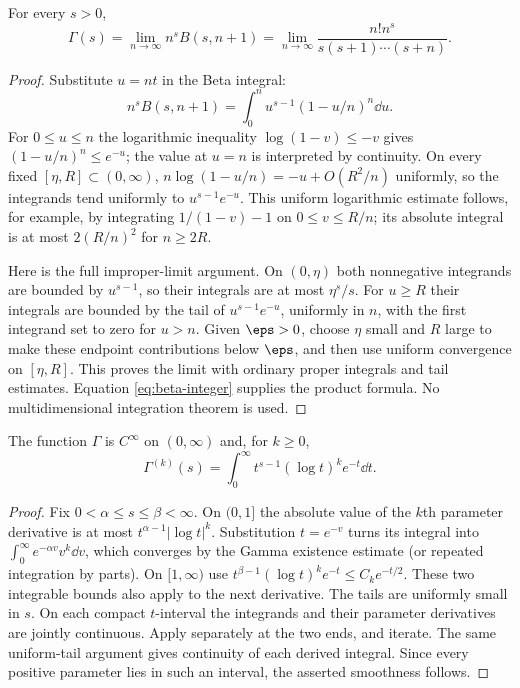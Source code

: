 \begin{theorem}
For every $s>0$,
\begin{equation}\label{eq:gamma-euler}
 \Gamma(s)=\lim_{n\to\infty}n^sB(s,n+1)
 =\lim_{n\to\infty}\frac{n!n^s}{s(s+1)\cdots(s+n)}.
\end{equation}
\end{theorem}
\begin{proof}
Substitute $u=nt$ in the Beta integral:
\[
 n^sB(s,n+1)=\int_0^n u^{s-1}(1-u/n)^n\dd u.
\]
For $0\leq u\leq n$ the logarithmic inequality $\log(1-v)\leq-v$ gives
$(1-u/n)^n\leq e^{-u}$; the value at $u=n$ is interpreted by continuity.
On every fixed $[\eta,R]\subset(0,\infty)$,
$n\log(1-u/n)=-u+O(R^2/n)$ uniformly, so the integrands tend uniformly to
$u^{s-1}e^{-u}$. This uniform logarithmic estimate follows, for example, by
integrating $1/(1-v)-1$ on $0\leq v\leq R/n$; its absolute integral is at most
$2(R/n)^2$ for $n\geq2R$.

Here is the full improper-limit argument. On $(0,\eta)$ both nonnegative
integrands are bounded by $u^{s-1}$, so their integrals are at most $\eta^s/s$.
For $u\geq R$ their integrals are bounded by the tail of
$u^{s-1}e^{-u}$, uniformly in $n$, with the first integrand set to zero for
$u>n$. Given $\eps>0$, choose $\eta$ small and $R$ large to make these endpoint
contributions below $\eps$, and then use uniform convergence on $[\eta,R]$.
This proves the limit with ordinary proper integrals and tail estimates.
Equation \eqref{eq:beta-integer} supplies the product formula. No
multidimensional integration theorem is used.
\end{proof}

\begin{theorem}
The function $\Gamma$ is $C^\infty$ on $(0,\infty)$ and, for $k\geq0$,
\[
 \Gamma^{(k)}(s)=\int_0^\infty t^{s-1}(\log t)^k e^{-t}\dd t.
\]
\end{theorem}
\begin{proof}
Fix $0<\alpha\leq s\leq\beta<\infty$. On $(0,1]$ the absolute value of the
$k$th parameter derivative is at most
$t^{\alpha-1}|\log t|^k$. Substitution $t=e^{-v}$ turns its integral into
$\int_0^\infty e^{-\alpha v}v^k\dd v$, which converges by the Gamma
existence estimate (or repeated integration by parts). On $[1,\infty)$ use
$t^{\beta-1}(\log t)^ke^{-t}\leq C_k e^{-t/2}$. These two integrable bounds
also apply to the next derivative. The tails are uniformly small in $s$.
On each compact $t$-interval the integrands and their parameter derivatives are
jointly continuous. Apply  separately at the
two ends, and iterate. The same uniform-tail argument gives continuity of each
derived integral. Since every positive parameter lies in such an interval,
the asserted smoothness follows.
\end{proof}


